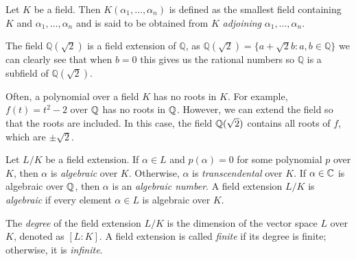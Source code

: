 \begin{definition}
    Let $K$ be a field. Then $K(\alpha_1, \dots, \alpha_n)$ is defined as the smallest field containing $K$ and $\alpha_1, \dots, \alpha_n$ and is said to be obtained from $K$ \textit{adjoining} $\alpha_1, \dots, \alpha_n$. 
\end{definition}

\begin{example}
The field \(\mathbb{Q}(\sqrt{2})\) is a field extension of \(\mathbb{Q}\), as \(\mathbb{Q}(\sqrt{2}) = \{a + \sqrt{2}b : a,b \in \mathbb{Q}\}\) we can clearly see that when \(b = 0\) this gives us the rational numbers so \(\mathbb{Q}\) is a subfield of \(\mathbb{Q}(\sqrt{2})\).
\end{example}

Often, a polynomial over a field $K$ has no roots in $K$. For example, $f(t) = t^2 - 2$ over $\mathbb Q$ has no roots in $\mathbb Q$. However, we can extend the field so that the roots are included. In this case, the field $\mathbb Q(\sqrt 2)$ contains all roots of $f$, which are $\pm \sqrt 2$.

\begin{definition}
Let $L/K$ be a field extension. If \(\alpha \in L\) and \(p(\alpha)=0\) for some polynomial \(p\) over \(K\), then \(\alpha\) is \textit{algebraic} over $K$. Otherwise, \(\alpha\) is \textit{transcendental} over \(K\). If $\alpha \in \mathbb C$ is algebraic over $\mathbb Q$, then $\alpha$ is an \textit{algebraic number}.     A field extension $L/K$ is \textit{algebraic} if every element $\alpha \in L$ is algebraic over $K$. 
\end{definition}


\begin{definition}
    The \textit{degree} of the field extension $L/K$ is the dimension of the vector space $L$ over $K$, denoted as $[L:K]$.
    A field extension is called \textit{finite} if its degree is finite; otherwise, it is \textit{infinite}. 
\end{definition}

